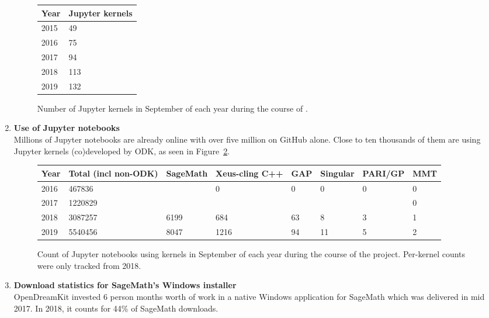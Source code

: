 \begin{enumerate}
  \begin{figure}
  \begin{tabular}{|l|l|}\hline
    Year & Jupyter kernels \\
    \hline
    2015 & 49 \\
    2016 & 75 \\
    2017 & 94 \\
    2018 & 113 \\
    2019 & 132 \\
    \hline
  \end{tabular}
  \caption{Number of Jupyter kernels in September of each year
  during the course of \ODK.}
  \label{fig:count-kernels}
  \end{figure}

\item \textbf{Use of Jupyter notebooks}\\
  Millions of Jupyter notebooks are already online with over five million
  on GitHub alone. Close to ten thousands of them are using Jupyter kernels (co)developed by ODK, as seen in Figure~\ref{fig:count-notebooks}.

  \begin{figure}
  \begin{tabular}{|l|l|l|l|l|l|l|l|}\hline
    Year & Total (incl non-ODK) & SageMath & Xeus-cling C++ & GAP & Singular & PARI/GP & MMT \\
    \hline
    2016 & 467836 & & 0 & 0 & 0 & 0 & 0 \\
    2017 & 1220829 & & & & & & 0 \\
    2018 & 3087257 & 6199 & 684 & 63 & 8 & 3 & 1 \\
    2019 & 5540456 & 8047 & 1216 & 94 & 11 & 5 & 2\\
    \hline
  \end{tabular}
  \caption{Count of Jupyter notebooks using \ODK kernels in September of each year
  during the course of the project.
  Per-kernel counts were only tracked from 2018.}
  \label{fig:count-notebooks}
  \end{figure}

\item \textbf{Download statistics for SageMath's Windows installer}\\
  OpenDreamKit invested 6 person months worth of work in a native Windows
  application for SageMath which was delivered in mid 2017. In 2018,
  it counts for 44\% of SageMath downloads.



\end{enumerate}
